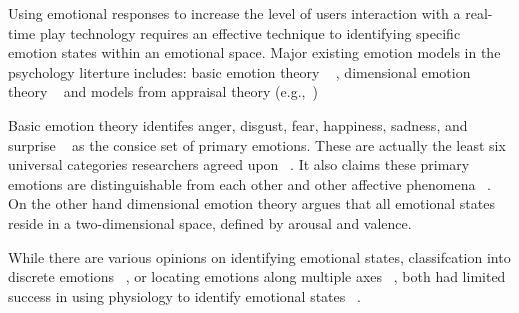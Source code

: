 

Using emotional responses to increase the level of users interaction with a real-time 
play technology requires an effective technique to identifying specific emotion 
states within an emotional space. Major existing emotion models in the
psychology literture includes: basic emotion theory ~\cite{ekman1992argument, ekman1992there} ,
dimensional emotion theory ~\cite{lang1995emotion, russell1980circumplex} and models 
from appraisal theory (e.g.,~\cite{roseman2001model}) ~\cite{zhang2010service}

Basic emotion theory identifes anger, disgust, fear, happiness, sadness, and 
surprise ~\cite{peter2006emotion} as the consice set of primary
emotions. These are actually the least six universal categories researchers agreed 
upon ~\cite{zagalo2004story}. It also claims these
primary emotions are distinguishable from each other and
other affective phenomena ~\cite{dalgleish1999handbook}. On the other hand dimensional 
emotion theory argues that all emotional states reside
in a two-dimensional space, defined by arousal and valence.

While there are various opinions on identifying emotional
states, classifcation into discrete emotions ~\cite{dalgleish1999handbook}, or locating
emotions along multiple axes ~\cite{russell1989affect, lang1995emotion}, both 
had limited success in using physiology to identify 
emotional states ~\cite{cacioppo2000psychophysiology}.

